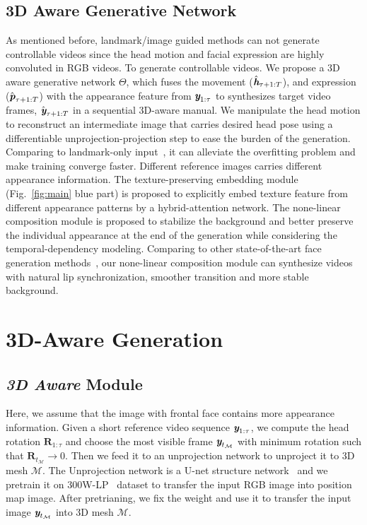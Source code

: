 \documentclass[runningheads]{llncs}
\def\mathbi#1{\textbf{\em #1}}
\providecommand{\ytian}[1]{\textcolor{green}{[{\bf #1}]}}
\begin{document}
\subsection{3D Aware Generative Network}
\label{subsec:3dgenerator}
As mentioned before, landmark/image guided methods can not generate controllable videos since the head motion and facial expression are highly convoluted in RGB videos. To generate controllable videos. We propose a 3D aware generative network $\Theta$, which fuses the movement ($\hat{\mathbi{h}}_{\tau + 1:T}$), and expression ($\hat{\mathbi{p}}_{\tau + 1:T}$) with the appearance feature from ${\mathbi{y}}_{1:\tau }$ to synthesizes target video frames, $\hat{\mathbi{y}}_{\tau + 1:T}$ in a sequential 3D-aware manual. We manipulate the head motion to reconstruct an intermediate image that carries desired head pose using a differentiable unprojection-projection step to ease the burden of the generation. Comparing to landmark-only input~\cite{zakharov2019few,wang2018fewshotvid2vid,wang2018high}, it can alleviate the overfitting problem and make training converge faster. Different reference images carries different appearance information. The texture-preserving embedding module (Fig.~\ref{fig:main} blue part) is proposed to explicitly embed texture feature from different  appearance patterns by a hybrid-attention network. The none-linear composition module is proposed to stabilize the background and better preserve the individual appearance at the end of the generation while considering the temporal-dependency modeling. Comparing to other state-of-the-art face generation methods~\cite{chung2017you,pumarola2019ganimation,zhou2019talking,zakharov2019few,wang2018high}, our none-linear composition module can synthesize videos with natural lip synchronization, smoother transition and more stable background.

\section{3D-Aware Generation}
\label{sec:3dgan}
\subsection{\textit{\textbf{3D Aware}} Module}
\label{subsec:3d_man}

{ \indent Here, we assume that the image with frontal face contains more appearance information. Given a short reference video sequence $\mathbi{y}_{1:\tau}$, we compute the head rotation $\mathbf{R}_{1:\tau}$ and choose the most visible frame $\mathbi{y}_{t_{\mathcal{M}}}$ with minimum rotation such that $\mathbf{R}_{t_{\mathcal{M}}} \rightarrow 0$. Then we feed it to an unprojection network to unproject it to 3D mesh $\mathcal{M}$. The Unprojection network is a U-net structure network~\cite{feng2018joint} and we pretrain it on  300W-LP~\cite{zhu2016face} dataset to transfer the input RGB image into position map image. After pretrianing, we fix the weight and use it to transfer the input image $\mathbi{y}_{t_{\mathcal{M}}}$ into 3D mesh $\mathcal{M}$.}
 
\end{document}

